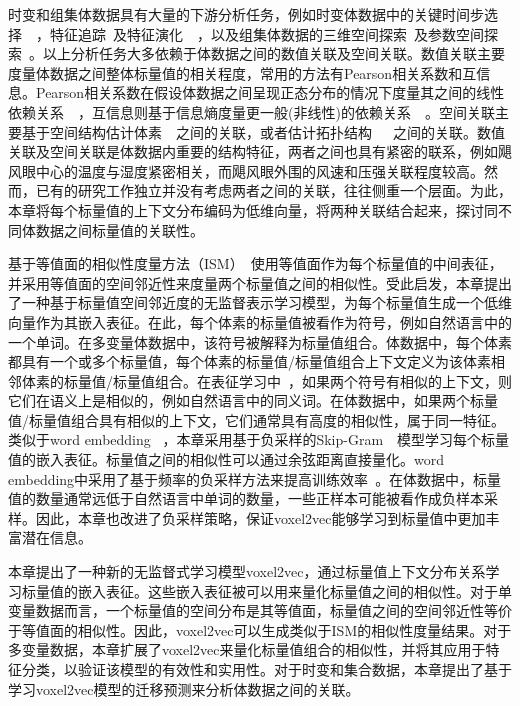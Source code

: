 时变和组集体数据具有大量的下游分析任务，例如时变体数据中的关键时间步选择~\cite{ZHOU:2018:KTS}~\cite{PORTER:2019:ADL}，特征追踪~\cite{WANG:2013:SPF}及特征演化~\cite{LUKASCZYK:2017:NTG}~\cite{LUKASCZYK:2019:DNT}，以及组集体数据的三维空间探索~\cite{LEISTIKOW:2019:AEV}及参数空间探索~\cite{BURCKNER:2010:RDE}。以上分析任务大多依赖于体数据之间的数值关联及空间关联。数值关联主要度量体数据之间整体标量值的相关程度，常用的方法有Pearson相关系数和互信息。Pearson相关系数在假设体数据之间呈现正态分布的情况下度量其之间的线性依赖关系~\cite{SAUBER:2006:MAA}~\cite{SUKHAREV:2009:CSO}，互信息则基于信息熵度量更一般(非线性)的依赖关系~\cite{BISWAS:2013:AIF}~\cite{DUTTA:2017:PIG}。空间关联主要基于空间结构估计体素~\cite{SAUBER:2006:MAA}~\cite{NAGARAJ:2011:AGC}之间的关联，或者估计拓扑结构~\cite{SCHNEIDER:2008:ICO}~\cite{SCHNEIDER:2013:ICO}~\cite{CARR:2014:JCN}之间的关联。数值关联及空间关联是体数据内重要的结构特征，两者之间也具有紧密的联系，例如飓风眼中心的温度与湿度紧密相关，而飓风眼外围的风速和压强关联程度较高。然而，已有的研究工作独立并没有考虑两者之间的关联，往往侧重一个层面。为此，本章将每个标量值的上下文分布编码为低维向量，将两种关联结合起来，探讨同不同体数据之间标量值的关联性。

基于等值面的相似性度量方法（ISM）~\cite{BRUCKNER:2010:ISM}使用等值面作为每个标量值的中间表征，并采用等值面的空间邻近性来度量两个标量值之间的相似性。受此启发，本章提出了一种基于标量值空间邻近度的无监督表示学习模型，为每个标量值生成一个低维向量作为其嵌入表征。在此，每个体素的标量值被看作为符号，例如自然语言中的一个单词。在多变量体数据中，该符号被解释为标量值组合。体数据中，每个体素都具有一个或多个标量值，每个体素的标量值/标量值组合上下文定义为该体素相邻体素的标量值/标量值组合。在表征学习中~\cite{BENGIO:2013:RLA}，如果两个符号有相似的上下文，则它们在语义上是相似的，例如自然语言中的同义词。在体数据中，如果两个标量值/标量值组合具有相似的上下文，它们通常具有高度的相似性，属于同一特征。类似于word embedding~\cite{COLLOBERT:2011:NLP} ，本章采用基于负采样的Skip-Gram~\cite{MIKOLOV:2013:EEO}~\cite{MIKOLOV:2013:DRO}模型学习每个标量值的嵌入表征。标量值之间的相似性可以通过余弦距离直接量化。word embedding中采用了基于频率的负采样方法来提高训练效率~\cite{MIKOLOV:2013:EEO}。在体数据中，标量值的数量通常远低于自然语言中单词的数量，一些正样本可能被看作成负样本采样。因此，本章也改进了负采样策略，保证voxel2vec能够学习到标量值中更加丰富潜在信息。

本章提出了一种新的无监督式学习模型voxel2vec，通过标量值上下文分布关系学习标量值的嵌入表征。这些嵌入表征被可以用来量化标量值之间的相似性。对于单变量数据而言，一个标量值的空间分布是其等值面，标量值之间的空间邻近性等价于等值面的相似性。因此，voxel2vec可以生成类似于ISM的相似性度量结果。对于多变量数据，本章扩展了voxel2vec来量化标量值组合的相似性，并将其应用于特征分类，以验证该模型的有效性和实用性。对于时变和集合数据，本章提出了基于学习voxel2vec模型的迁移预测来分析体数据之间的关联。


